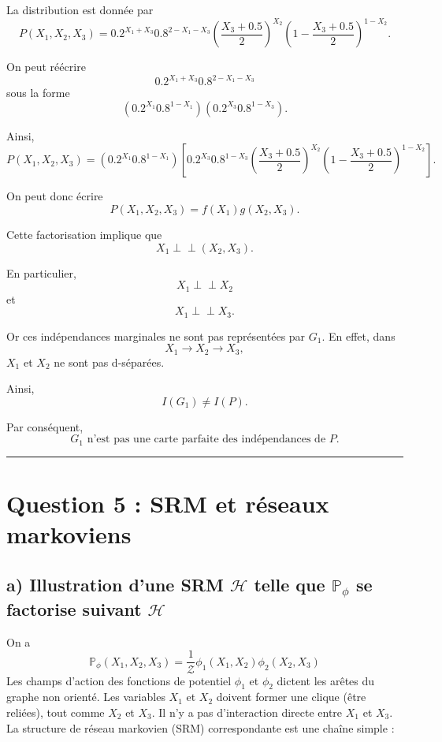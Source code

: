 \documentclass{article}
\begin{document}
La distribution est donnée par
\[
P(X_1,X_2,X_3)
=
0.2^{X_1+X_3}
0.8^{2-X_1-X_3}
\left(
\frac{X_3+0.5}{2}
\right)^{X_2}
\left(
1-\frac{X_3+0.5}{2}
\right)^{1-X_2}.
\]

On peut réécrire
\[
0.2^{X_1+X_3}
0.8^{2-X_1-X_3}
\]
sous la forme
\[
\left(
0.2^{X_1}0.8^{1-X_1}
\right)
\left(
0.2^{X_3}0.8^{1-X_3}
\right).
\]

Ainsi,
\[
P(X_1,X_2,X_3)
=
\left(
0.2^{X_1}0.8^{1-X_1}
\right)
\left[
0.2^{X_3}0.8^{1-X_3}
\left(
\frac{X_3+0.5}{2}
\right)^{X_2}
\left(
1-\frac{X_3+0.5}{2}
\right)^{1-X_2}
\right].
\]

On peut donc écrire
\[
P(X_1,X_2,X_3)
=
f(X_1)g(X_2,X_3).
\]

Cette factorisation implique que
\[
X_1 \perp\!\!\!\perp (X_2,X_3).
\]

En particulier,
\[
X_1 \perp\!\!\!\perp X_2
\]
et
\[
X_1 \perp\!\!\!\perp X_3.
\]

Or ces indépendances marginales ne sont pas représentées par $G_1$. En effet, dans
\[
X_1 \longrightarrow X_2 \longrightarrow X_3,
\]
$X_1$ et $X_2$ ne sont pas d-séparées.

Ainsi,
\[
I(G_1)\neq I(P).
\]

Par conséquent,
\[
G_1
\text{ n'est pas une carte parfaite des indépendances de }P.
\]

\vspace{1cm}
\hrule
\vspace{1cm}

\section*{Question 5 : SRM et réseaux markoviens}

\subsection*{a) Illustration d'une SRM $\mathcal{H}$ telle que $\mathbb{P}_\phi$ se factorise suivant $\mathcal{H}$}

On a  
\[ \mathbb{P}_\phi(X_1, X_2, X_3) = \frac{1}{\mathcal{Z}} \phi_1(X_1, X_2) \phi_2(X_2, X_3) \]
Les champs d'action des fonctions de potentiel $\phi_1$ et $\phi_2$ dictent les arêtes du graphe non orienté. Les variables $X_1$ et $X_2$ doivent former une clique (être reliées), tout comme $X_2$ et $X_3$. Il n'y a pas d'interaction directe entre $X_1$ et $X_3$. La structure de réseau markovien (SRM) correspondante est une chaîne simple :

\begin{center}
\end{center}
\end{document}
